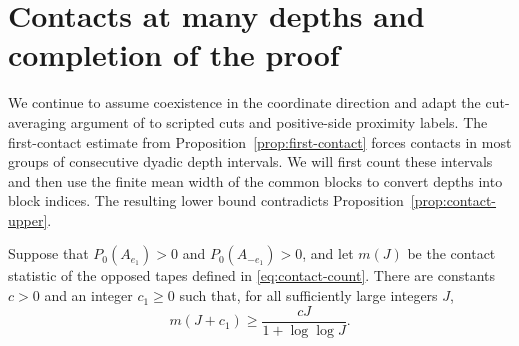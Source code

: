 \section{Contacts at many depths and completion of the proof}
\label{sec:contact-lower}

We continue to assume coexistence in the coordinate direction and adapt the
cut-averaging argument of \cite[Proposition~7.1]{OpenAI2026} to scripted cuts
and positive-side proximity labels.  The first-contact estimate from
Proposition~\ref{prop:first-contact} forces contacts in most groups
of consecutive dyadic depth intervals.  We will first count these intervals and
then use the finite mean width of the common blocks to convert depths into block
indices.  The resulting lower bound contradicts
Proposition~\ref{prop:contact-upper}.

\begin{proposition}\label{prop:contact-lower}
Suppose that $P_0(A_{e_1})>0$ and $P_0(A_{-e_1})>0$, and let $m(J)$ be the
contact statistic of the opposed tapes defined in \eqref{eq:contact-count}.
There are constants $c>0$ and an integer $c_1\ge0$ such that, for all sufficiently
large integers $J$,
\begin{equation}\label{eq:contact-lower}
 m(J+c_1)\ge \frac{cJ}{1+\log\log J}.
\end{equation}
\end{proposition}


